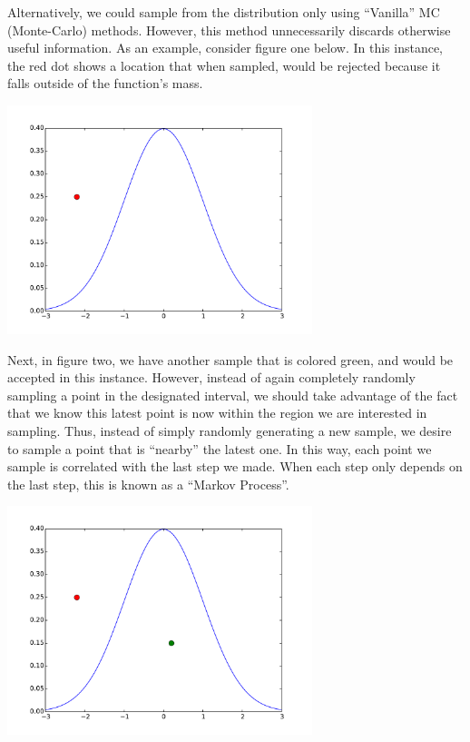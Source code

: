 \documentclass{article}
\begin{document}
Alternatively, we could sample from the distribution only using ``Vanilla'' 
MC (Monte-Carlo) methods. However, this method unnecessarily discards otherwise useful 
information. As an example, consider figure one below. In this instance, the red dot shows a location
that when sampled, would be rejected because it falls outside of the function's mass. 

\begin{center}
 \includegraphics[width=3.5in]{figs/norm}
\end{center}

Next, in figure two, we have another sample that is colored green, and would be accepted in this instance. 
However, instead of again completely randomly sampling a point in the designated interval, 
we should take advantage of the fact that we know this latest point is now within the region we are interested in sampling. 
Thus, instead of simply randomly generating a new sample, we desire to sample a point that is ``nearby'' the latest one. In this way, 
each point we sample is correlated with the last step we made. When each step only depends on the last step, 
this is known as a ``Markov Process''. 

\begin{center}
 \includegraphics[width=3.5in]{figs/norm-acc}
\end{center}
\end{document}

